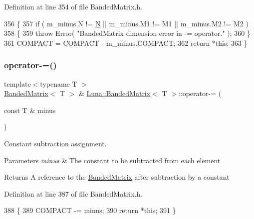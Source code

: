 Definition at line 354 of file Banded\+Matrix.\+h.


\begin{DoxyCode}
356   \{
357     \textcolor{keywordflow}{if} ( m\_minus.N != \hyperlink{namespaceHeat__plot_a7d050092798e28458a263710837bda77}{N} || m\_minus.M1 != M1 || m\_minus.M2 != M2 )
358     \{
359       \textcolor{keywordflow}{throw} Error( \textcolor{stringliteral}{"BandedMatrix dimension error in -= operator."} );
360     \}
361     COMPACT = COMPACT - m\_minus.COMPACT;
362     \textcolor{keywordflow}{return} *\textcolor{keyword}{this};
363   \}
\end{DoxyCode}
\mbox{\label{classLuna_1_1BandedMatrix_aeb5d53779b22b9a4e378f0a2af96ef77}} 
\subsubsection{\texorpdfstring{operator-\/=()}{operator-=()}\hspace{0.1cm}{\footnotesize\ttfamily [2/2]}}
{\footnotesize\ttfamily template$<$typename T $>$ \\
\hyperlink{classLuna_1_1BandedMatrix}{Banded\+Matrix}$<$ T $>$ \& \hyperlink{classLuna_1_1BandedMatrix}{Luna\+::\+Banded\+Matrix}$<$ T $>$\+::operator-\/= (\begin{DoxyParamCaption}\item[{const T \&}]{minus }\end{DoxyParamCaption})\hspace{0.3cm}{\ttfamily [inline]}}



Constant subtraction assignment. 


\begin{DoxyParams}{Parameters}
{\em minus} & The constant to be subtracted from each element \\
\hline
\end{DoxyParams}
\begin{DoxyReturn}{Returns}
A reference to the \hyperlink{classLuna_1_1BandedMatrix}{Banded\+Matrix} after subtraction by a constant 
\end{DoxyReturn}


Definition at line 387 of file Banded\+Matrix.\+h.


\begin{DoxyCode}
388   \{
389     COMPACT -= minus;
390     \textcolor{keywordflow}{return} *\textcolor{keyword}{this};
391   \}
\end{DoxyCode}
\mbox{\label{classLuna_1_1BandedMatrix_ae93fe94b20edf5b66e4041cf6862833b}} 

